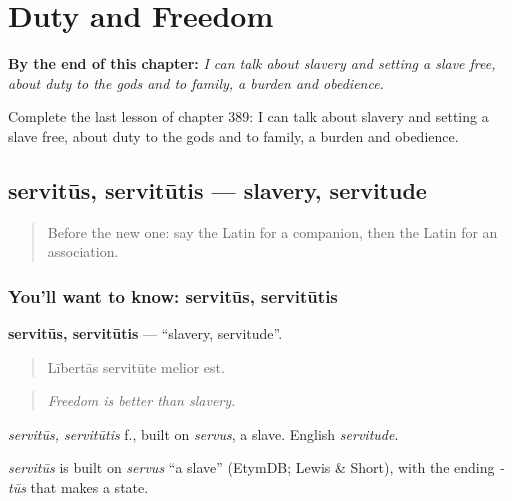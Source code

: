 
\chapter{Duty and Freedom}
\label{ch:la-duty-and-freedom}

\begin{chapteropening}
\textbf{By the end of this chapter:} \emph{I can talk about slavery and setting a slave free, about duty to the gods and to family, a burden and obedience.}

Complete the last lesson of chapter 389: I can talk about slavery and setting a slave free, about duty to the gods and to family, a burden and obedience.
\end{chapteropening}

\section[servitūs, servitūtis]{servitūs, servitūtis — slavery, servitude}

\label{lesson:LA-C389-servitus}



\begin{quote}
Before the new one: say the Latin for a companion, then the Latin for an association.
\end{quote}

\subsection*{You'll want to know: servitūs, servitūtis}
\textbf{servitūs, servitūtis} — \textquotedblleft{}slavery, servitude\textquotedblright{}.

\begin{quote}
Lībertās servitūte melior est.
\end{quote}

\begin{quote}
\emph{Freedom is better than slavery.}
\end{quote}

\emph{servitūs, servitūtis} f., built on \emph{servus}, a slave. English \emph{servitude}.

\begin{cousinweb}
\emph{servitūs} is built on \emph{servus} \textquotedblleft{}a slave\textquotedblright{} (EtymDB; Lewis \& Short), with the ending \emph{-tūs} that makes a state.
\end{cousinweb}

